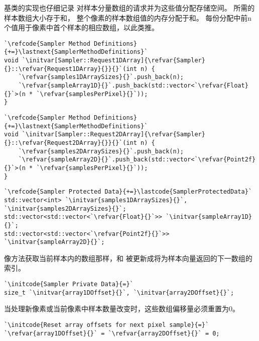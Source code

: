 基类的实现也仔细记录
对样本分量数组的请求并为这些值分配存储空间。
所需的样本数组大小存于和，
整个像素的样本数组值的内存分配于和。
每份分配中前{\ttfamily n}个值用于像素中首个样本的相应数组，以此类推。
\begin{lstlisting}
`\refcode{Sampler Method Definitions}{+=}\lastnext{SamplerMethodDefinitions}`
void `\initvar[Sampler::Request1DArray]{\refvar{Sampler}{}::\refvar{Request1DArray}{}}{}`(int n) {
    `\refvar{samples1DArraySizes}{}`.push_back(n);
    `\refvar{sampleArray1D}{}`.push_back(std::vector<`\refvar{Float}{}`>(n * `\refvar{samplesPerPixel}{}`));
}
\end{lstlisting}
\begin{lstlisting}
`\refcode{Sampler Method Definitions}{+=}\lastnext{SamplerMethodDefinitions}`
void `\initvar[Sampler::Request2DArray]{\refvar{Sampler}{}::\refvar{Request2DArray}{}}{}`(int n) {
    `\refvar{samples2DArraySizes}{}`.push_back(n);
    `\refvar{sampleArray2D}{}`.push_back(std::vector<`\refvar{Point2f}{}`>(n * `\refvar{samplesPerPixel}{}`));
}
\end{lstlisting}
\begin{lstlisting}
`\refcode{Sampler Protected Data}{+=}\lastcode{SamplerProtectedData}`
std::vector<int> `\initvar{samples1DArraySizes}{}`, `\initvar{samples2DArraySizes}{}`;
std::vector<std::vector<`\refvar{Float}{}`>> `\initvar{sampleArray1D}{}`;
std::vector<std::vector<`\refvar{Point2f}{}`>> `\initvar{sampleArray2D}{}`;
\end{lstlisting}

像方法获取当前样本内的数组那样，和
被更新成将为样本向量返回的下一数组的索引。
\begin{lstlisting}
`\initcode{Sampler Private Data}{=}`
size_t `\initvar{array1DOffset}{}`, `\initvar{array2DOffset}{}`;
\end{lstlisting}
当处理新像素或当前像素中样本数量改变时，这些数组偏移量必须重置为0。
\begin{lstlisting}
`\initcode{Reset array offsets for next pixel sample}{=}`
`\refvar{array1DOffset}{}` = `\refvar{array2DOffset}{}` = 0;
\end{lstlisting}

